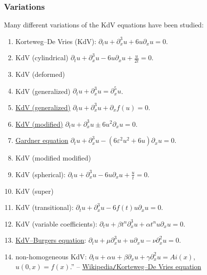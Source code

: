 \documentclass{article}
\begin{document}
\subsubsection{Variations}
Many different variations of the KdV equations have been studied:
\begin{enumerate}
	\item Korteweg–De Vries (KdV): $\partial_tu + \partial_x^3u + 6u\partial_xu = 0$.
	\item KdV (cylindrical) $\partial_tu + \partial_x^3u - 6u\partial_xu + \frac{u}{2t} = 0$.
	\item KdV (deformed)
	\item KdV (generalized) $\partial_tu + \partial_x^3u = \partial_x^5u$.
	\item \href{https://en.wikipedia.org/wiki/Generalized_Korteweg%E2%80%93De_Vries_equation}{KdV (generalized)} $\partial_tu + \partial_x^3u + \partial_xf(u) = 0$.
	\item \href{https://en.wikipedia.org/wiki/Modified_Korteweg-De_Vries_equation}{KdV (modified)} $\partial_tu + \partial_x^3u\pm6u^2\partial_xu = 0$.
	\item \href{https://en.wikipedia.org/wiki/Gardner_equation}{Gardner equation} $\partial_tu + \partial_x^3u - (6\varepsilon^2u^2 + 6u)\partial_xu = 0$.
	\item KdV (modified modified)
	\item KdV (spherical): $\partial_tu + \partial_x^3u - 6u\partial_xu + \frac{u}{t} = 0$.
	\item KdV (super)
	\item KdV (transitional): $\partial_tu + \partial_x^3u - 6f(t)u\partial_xu = 0$.
	\item KdV (variable coefficients): $\partial_tu + \beta t^n\partial_x^3u + \alpha t^nu\partial_xu = 0$.
	\item \href{https://en.wikipedia.org/wiki/Korteweg-de_Vries-Burgers%27_equation}{KdV--Burgers equation}: $\partial_tu + \mu\partial_x^3u + u\partial_xu - \nu\partial_x^2u = 0$.
	\item non-homogeneous KdV: $\partial_tu + \alpha u + \beta\partial_xu + \gamma\partial_x^2u = Ai(x)$, $u(0,x) = f(x)$.'' -- \href{https://en.wikipedia.org/wiki/Korteweg–De_Vries_equation}{Wikipedia{\tt/}Korteweg--De Vries equation}
\end{enumerate}

\end{document}

